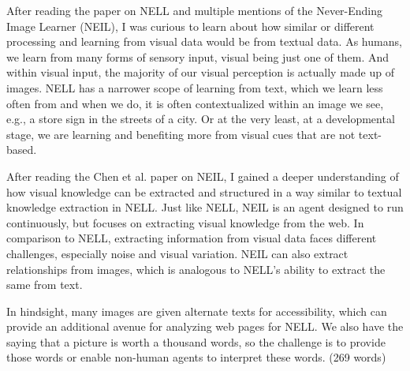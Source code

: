 \documentclass[12pt, letterpaper]{article}
\begin{document}
After reading the paper on NELL and multiple mentions of the Never-Ending Image Learner (NEIL), I was curious to learn about how similar or different processing and learning from visual data would be from textual data. As humans, we learn from many forms of sensory input, visual being just one of them. And within visual input, the majority of our visual perception is actually made up of images. NELL has a narrower scope of learning from text, which we learn less often from and when we do, it is often contextualized within an image we see, e.g., a store sign in the streets of a city. Or at the very least, at a developmental stage, we are learning and benefiting more from visual cues that are not text-based.

After reading the Chen et al. paper on NEIL, I gained a deeper understanding of how visual knowledge can be extracted and structured in a way similar to textual knowledge extraction in NELL. Just like NELL, NEIL is an agent designed to run continuously, but focuses on extracting visual knowledge from the web. In comparison to NELL, extracting information from visual data faces different challenges, especially noise and visual variation. NEIL can also extract relationships from images, which is analogous to NELL's ability to extract the same from text.

In hindsight, many images are given alternate texts for accessibility, which can provide an additional avenue for analyzing web pages for NELL. We also have the saying that a picture is worth a thousand words, so the challenge is to provide those words or enable non-human agents to interpret these words. (269 words)
\end{document}
